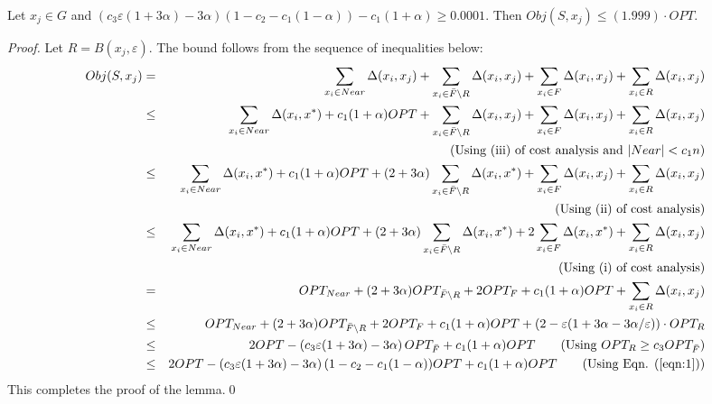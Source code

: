 \documentclass[11pt]{llncs}
\newcommand{\veps}{\varepsilon}
\begin{document}
\begin{lemma}\label{lemma:5}
Let $x_j \in G$ and  $\left( c_3 \veps (1+3\alpha) - 3\alpha\right) (1 - c_2 - c_1(1-\alpha)) - c_1(1+\alpha) \geq 0.0001$.
Then $Obj(S, x_j) \leq (1.999) \cdot OPT$.
\end{lemma}
\begin{proof}
Let $R = B(x_j, \veps)$. The bound follows from the sequence of inequalities below:
\begin{eqnarray*}
Obj(S, x_j) &=& \sum_{x_i \in Near} \Delta(x_i, x_j)  + \sum_{x_i \in \bar{F}\setminus R} \Delta(x_i, x_j) + \sum_{x_i \in F} \Delta(x_i, x_j) + \sum_{x_i \in R} \Delta(x_i, x_j)\\
&\leq& \sum_{x_i \in Near} \Delta(x_i, x^*) + c_1(1+\alpha)OPT + \sum_{x_i \in \bar{F}\setminus R} \Delta(x_i, x_j) + \sum_{x_i \in F} \Delta(x_i, x_j) + \sum_{x_i \in R} \Delta(x_i, x_j)\\
&& \quad \textrm{(Using (iii) of cost analysis and $|Near| < c_1 n$)}\\
&\leq&\sum_{x_i \in Near} \Delta(x_i, x^*) + c_1(1+\alpha)OPT + (2+3\alpha) \sum_{x_i \in \bar{F}\setminus R} \Delta(x_i, x^*) + \sum_{x_i \in F} \Delta(x_i, x_j) + \sum_{x_i \in R} \Delta(x_i, x_j)\\
&& \quad \textrm{(Using (ii) of cost analysis)}\\
&\leq&\sum_{x_i \in Near} \Delta(x_i, x^*) + c_1(1+\alpha)OPT + (2+3\alpha) \sum_{x_i \in \bar{F}\setminus R} \Delta(x_i, x^*) + 2 \sum_{x_i \in F} \Delta(x_i, x^*) + \sum_{x_i \in R} \Delta(x_i, x_j)\\
&& \quad \textrm{(Using (i) of cost analysis)}\\
&=& OPT_{Near} + (2+3\alpha) OPT_{\bar{F}\setminus R} + 2 OPT_{F} + c_1(1+\alpha)OPT + \sum_{x_i \in R} \Delta(x_i, x_j)\\
&\leq& OPT_{Near} + (2+3\alpha) OPT_{\bar{F}\setminus R} + 2 OPT_{F} + c_1(1+\alpha)OPT + \left(2 - \veps (1+3\alpha-3\alpha/\veps)\right) \cdot OPT_{R}\\
&\leq& 2 OPT - \left( c_3 \veps (1+3\alpha) - 3\alpha\right) OPT_{\bar{F}} + c_1(1+\alpha)OPT \qquad \textrm{(Using $OPT_R \geq c_3 OPT_{\bar{F}}$)}\\
&\leq& 2 OPT -  \left( c_3 \veps (1+3\alpha) - 3\alpha\right) (1 - c_2 - c_1(1-\alpha))OPT + c_1(1+\alpha)OPT \qquad \textrm{(Using Eqn. (\ref{eqn:1}))}
\end{eqnarray*}
This completes the proof of the lemma.\qed
\end{proof}
\end{document}
